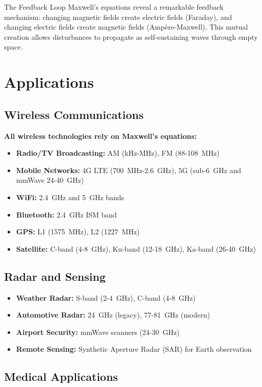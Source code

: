 \begin{calloutbox}{The Feedback Loop}
Maxwell's equations reveal a remarkable feedback mechanism: changing magnetic fields create electric fields (Faraday), and changing electric fields create magnetic fields (Ampère-Maxwell). This mutual creation allows disturbances to propagate as self-sustaining waves through empty space.
\end{calloutbox}

\section{Applications}

\subsection{Wireless Communications}

\textbf{All wireless technologies rely on Maxwell's equations:}
\begin{itemize}
\item \textbf{Radio/TV Broadcasting:} AM (kHz-MHz), FM (88-108~MHz)
\item \textbf{Mobile Networks:} 4G LTE (700~MHz-2.6~GHz), 5G (sub-6~GHz and mmWave 24-40~GHz)
\item \textbf{WiFi:} 2.4~GHz and 5~GHz bands
\item \textbf{Bluetooth:} 2.4~GHz ISM band
\item \textbf{GPS:} L1 (1575~MHz), L2 (1227~MHz)
\item \textbf{Satellite:} C-band (4-8~GHz), Ku-band (12-18~GHz), Ka-band (26-40~GHz)
\end{itemize}

\subsection{Radar and Sensing}

\begin{itemize}
\item \textbf{Weather Radar:} S-band (2-4~GHz), C-band (4-8~GHz)
\item \textbf{Automotive Radar:} 24~GHz (legacy), 77-81~GHz (modern)
\item \textbf{Airport Security:} mmWave scanners (24-30~GHz)
\item \textbf{Remote Sensing:} Synthetic Aperture Radar (SAR) for Earth observation
\end{itemize}

\subsection{Medical Applications}


